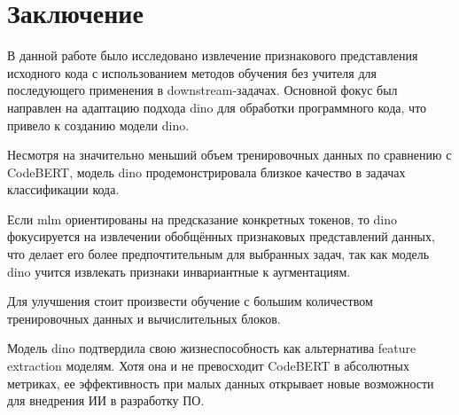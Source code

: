 \documentclass[../document.tex]{subfiles}
\begin{document}
\section{Заключение}
\par В данной работе было исследовано извлечение признакового представления исходного кода с использованием методов обучения без учителя для последующего применения в downstream-задачах. Основной фокус был направлен на адаптацию подхода \acrshort{dino} для обработки программного кода, что привело к созданию модели \acrshort{dino}.
\par Несмотря на значительно меньший объем тренировочных данных по сравнению с CodeBERT, модель \acrshort{dino} продемонстрировала близкое качество в задачах классификации кода.
\par Если \acrshort{mlm} ориентированы на предсказание конкретных токенов, то \acrshort{dino} фокусируется на извлечении обобщённых признаковых представлений данных, что делает его более предпочтительным для выбранных задач, так как модель \acrshort{dino} учится извлекать признаки инвариантные к аугментациям.
\par Для улучшения стоит произвести обучение с большим количеством тренировочных данных и вычислительных блоков.
\par Модель \acrshort{dino} подтвердила свою жизнеспособность как альтернатива feature extraction моделям. Хотя она и не превосходит CodeBERT в абсолютных метриках, ее эффективность при малых данных открывает новые возможности для внедрения ИИ в разработку ПО.
\end{document}
